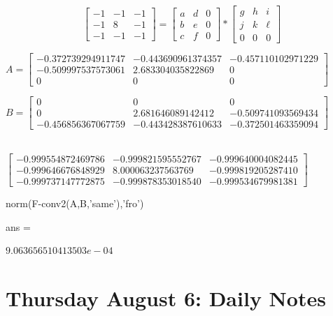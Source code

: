 \documentclass[12pt]{amsart}
\theoremstyle{definition}
\theoremstyle{remark}
\numberwithin{thm}{section}
\begin{document}
$$
\begin{bmatrix}
-1 & -1 & -1\\
-1 & 8 & -1\\
-1 & -1 & -1
\end{bmatrix}
=
\begin{bmatrix}
a & d & 0\\
b & e & 0\\
c & f & 0
\end{bmatrix} *
\begin{bmatrix}
g & h & i\\
j & k & \ell \\
0 & 0 & 0
\end{bmatrix}
$$

$
A =
\begin{bmatrix}
  -0.372739294911747  &-0.443690961374357 & -0.457110102971229\\
  -0.509997537573061  & 2.683304035822869 &                  0\\
                   0  &                 0 &                  0
\end{bmatrix}
$

$
B =
\begin{bmatrix}
                   0&                   0&                   0\\
                   0&   2.681646089142412&  -0.509741093569434\\
  -0.456856367067759&  -0.443428387610633&  -0.372501463359094
\end{bmatrix}
$

\\
$
\begin{bmatrix}
  -0.999554872469786  &-0.999821595552767  &-0.999640004082445\\
  -0.999646676848929  & 8.000063237563769  &-0.999819205287410\\
  -0.999737147772875  &-0.999878353018540  &-0.999534679981381
  \end{bmatrix}
$
  
  norm(F-conv2(A,B,'same'),'fro')

ans =

     $9.063656510413503e-04$


\section{Thursday August 6: Daily Notes}
\end{document}
